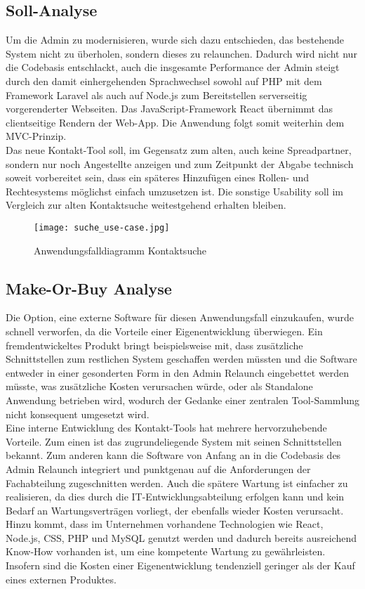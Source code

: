     \subsection{Soll-Analyse}
    Um die Admin zu modernisieren, wurde sich dazu entschieden, das bestehende System nicht zu überholen, sondern dieses zu relaunchen. Dadurch wird nicht nur die Codebasis entschlackt, auch die insgesamte Performance der Admin steigt durch den damit einhergehenden Sprachwechsel sowohl auf PHP mit dem Framework \glqq Laravel\grqq{} als auch auf Node.js zum Bereitstellen serverseitig vorgerenderter Webseiten. Das JavaScript-Framework \glqq React\grqq{} übernimmt das \mbox{clientseitige} Rendern der Web-App. Die Anwendung folgt somit weiterhin dem MVC-Prinzip.\\
    Das neue Kontakt-Tool soll, im Gegensatz zum alten, auch keine Spreadpartner, sondern nur noch Angestellte anzeigen und zum Zeitpunkt der Abgabe technisch soweit vorbereitet sein, dass ein späteres Hinzufügen eines Rollen- und Rechtesystems möglichst einfach umzusetzen ist. Die sonstige Usability soll im Vergleich zur alten Kontaktsuche weitestgehend erhalten bleiben.

    \begin{figure}[h]
        \centering
        \texttt{[image: suche\_use-case.jpg]}
        \caption{Anwendungsfalldiagramm \glqq Kontaktsuche\grqq{}}
    \end{figure}

\subsection{Make-Or-Buy Analyse}
    Die Option, eine externe Software für diesen Anwendungsfall einzukaufen, wurde schnell verworfen, da die Vorteile einer Eigenentwicklung überwiegen. Ein fremdentwickeltes Produkt bringt beispielsweise mit, dass zusätzliche Schnittstellen zum restlichen System geschaffen werden müssten und die Software entweder in einer gesonderten Form in den Admin Relaunch eingebettet werden müsste, was zusätzliche Kosten verursachen würde, oder als Standalone Anwendung betrieben wird, wodurch der Gedanke einer zentralen Tool-Sammlung nicht konsequent umgesetzt wird.\\
    Eine interne Entwicklung des Kontakt-Tools hat mehrere hervorzuhebende Vorteile. Zum einen ist das zugrundeliegende System mit seinen Schnittstellen bekannt. Zum anderen kann die Software von Anfang an in die Codebasis des Admin Relaunch integriert und punktgenau auf die Anforderungen der Fachabteilung zugeschnitten werden. Auch die spätere Wartung ist einfacher zu realisieren, da dies durch die IT-Entwicklungsabteilung erfolgen kann und kein Bedarf an Wartungsverträgen vorliegt, der ebenfalls wieder Kosten verursacht. Hinzu kommt, dass im Unternehmen vorhandene Technologien wie React, Node.js, CSS, PHP und MySQL genutzt werden und dadurch bereits ausreichend Know-How vorhanden ist, um eine kompetente Wartung zu gewährleisten. Insofern sind die Kosten einer Eigenentwicklung tendenziell geringer als der Kauf eines externen Produktes.\\



